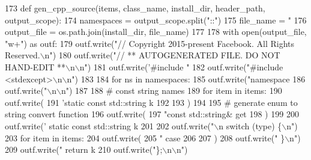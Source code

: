 \begin{DoxyCode}
173 \textcolor{keyword}{def }gen_cpp_source(items, class\_name, install\_dir, header\_path, output\_scope):
174     namespaces = output\_scope.split(\textcolor{stringliteral}{"::"})
175     file\_name = \textcolor{stringliteral}{"%
176     output\_file = os.path.join(install\_dir, file\_name)
177 
178     with open(output\_file, \textcolor{stringliteral}{"w+"}) \textcolor{keyword}{as} outf:
179         outf.write(\textcolor{stringliteral}{"// Copyright 2015-present Facebook. All Rights Reserved.\(\backslash\)n"})
180         outf.write(\textcolor{stringliteral}{"// ** AUTOGENERATED FILE. DO NOT HAND-EDIT **\(\backslash\)n\(\backslash\)n"})
181         outf.write(\textcolor{stringliteral}{'#include "%
182         outf.write(\textcolor{stringliteral}{"#include <stdexcept>\(\backslash\)n\(\backslash\)n"})
183 
184         \textcolor{keywordflow}{for} ns \textcolor{keywordflow}{in} namespaces:
185             outf.write(\textcolor{stringliteral}{"namespace %
186         outf.write(\textcolor{stringliteral}{"\(\backslash\)n\(\backslash\)n"})
187 
188         \textcolor{comment}{# const string names}
189         \textcolor{keywordflow}{for} item \textcolor{keywordflow}{in} items:
190             outf.write(
191                 \textcolor{stringliteral}{'static const std::string k%
192                 %
193             )
194 
195         \textcolor{comment}{# generate enum to string convert function}
196         outf.write(
197             \textcolor{stringliteral}{"const std::string& get%
198         )
199 
200         outf.write(\textcolor{stringliteral}{'  static const std::string k%
201 
202         outf.write(\textcolor{stringliteral}{"\(\backslash\)n  switch (type) \{\(\backslash\)n"})
203         \textcolor{keywordflow}{for} item \textcolor{keywordflow}{in} items:
204             outf.write(
205                 \textcolor{stringliteral}{"    case %
206                 %
207             )
208         outf.write(\textcolor{stringliteral}{"  \}\(\backslash\)n"})
209         outf.write(\textcolor{stringliteral}{"  return k%
210         outf.write(\textcolor{stringliteral}{"\};\(\backslash\)n\(\backslash\)n"})
}}}}}}}}
\end{DoxyCode}
